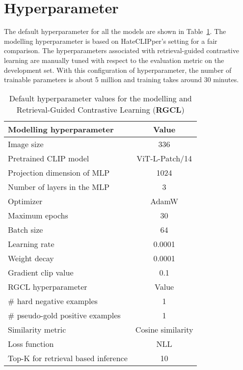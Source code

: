 \documentclass[11pt]{article}
\begin{document}
\section{Hyperparameter}
\label{appendix:hyperparam}
The default hyperparameter for all the models are shown in Table~\ref{tab:hyperparameters}. The modelling hyperparameter is based on HateCLIPper's setting \cite{KumarHateClip2022} for a fair comparison. The hyperparameters associated with retrieval-guided contrastive learning are manually tuned with respect to the evaluation metric on the development set. With this configuration of hyperparameter, the number of trainable parameters is about 5 million and training takes around 30 minutes.
\begin{table}[h]
\small
\centering
\caption{Default hyperparameter values for the modelling and Retrieval-Guided Contrastive Learning (\textbf{RGCL})}
\label{tab:hyperparameters}
\begin{tabular}{lc}
\toprule
Modelling hyperparameter & Value \\
\midrule
\midrule
Image size & 336 \\
Pretrained CLIP model & ViT-L-Patch/14 \\
Projection dimension of MLP & 1024 \\
Number of layers in the MLP & 3 \\
Optimizer & AdamW \\
Maximum epochs & 30 \\
Batch size & 64 \\
Learning rate & 0.0001 \\
Weight decay & 0.0001 \\
Gradient clip value & 0.1 \\
\midrule 
RGCL hyperparameter  & Value \\
\midrule
\midrule
\# hard negative examples & 1 \\
\# pseudo-gold positive examples & 1 \\
Similarity metric & Cosine similarity \\
Loss function & NLL \\
Top-K for retrieval based inference & 10\\ 

\bottomrule
\end{tabular}
\end{table}
\end{document}
